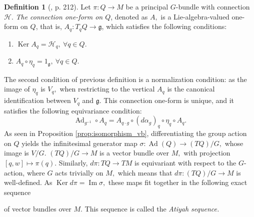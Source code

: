 \documentclass[12pt, letterpaper, reqno]{amsart}
\theoremstyle{definition}
\newtheorem{df}{Definition}
\theoremstyle{plain}
\theoremstyle{remark}
\begin{document}
\begin{df}[\cite{montgomery2002tour}, p. 212]
	Let $ \pi:Q \rightarrow M $ be a principal $ G $-bundle with connection $ \mathcal{H} $. \textit{The connection one-form on $ Q $}, denoted as $ A, $ is a Lie-algebra-valued one-form on $ Q $, that is, $ A_q: T_qQ \rightarrow \mathfrak{g} $,  which satisfies the following conditions:

	\begin{enumerate}
		\item $ \operatorname{Ker} A_q = \mathcal{H}_q, \ \forall q\in Q. $ 
		\item $ A_q \circ \eta_q = 1_{ \mathfrak{g}}, \ \forall q\in Q. $ 
	\end{enumerate}
\end{df}
The second condition of previous definition is a normalization condition: as the image of $ \eta_q $ is $ V_q, $ when restricting to the vertical $ A_q $ is the canonical identification between $ V_q $ and $ \mathfrak{g} $. This connection one-form is unique, and it satisfies the following equivariance condition:
$$ \operatorname{Ad}_{g^{-1}}\circ A_q = A_{q\cdot g}\circ (d\alpha_g)_q\circ \eta_q\circ A_q. $$ 
As seen in Proposition \ref{prop:isomorphism_vb}, differentiating the group action on $ Q $ yields the infinitesimal generator map $ \sigma: \operatorname{Ad}(Q) \rightarrow (TQ)/G,  $ whose image is $ V/G. $ $ (TQ)/G \rightarrow M $ is a vector bundle over $ M, $ with projection $ [q,w] \mapsto \pi(q). $ Similarly, $ d\pi: TQ \rightarrow TM $ is equivariant with respect to the $ G $-action, where $ G $ acts trivially on $ M, $ which means that $ d\pi: (TQ)/G \rightarrow M $ is well-defined. As $ \operatorname{Ker} d\pi = \operatorname{Im} \sigma,   $ these maps fit together in the following exact sequence
\begin{center}
\end{center}
of vector bundles over $ M. $ This sequence is called the \textit{Atiyah sequence.}  
\end{document}
